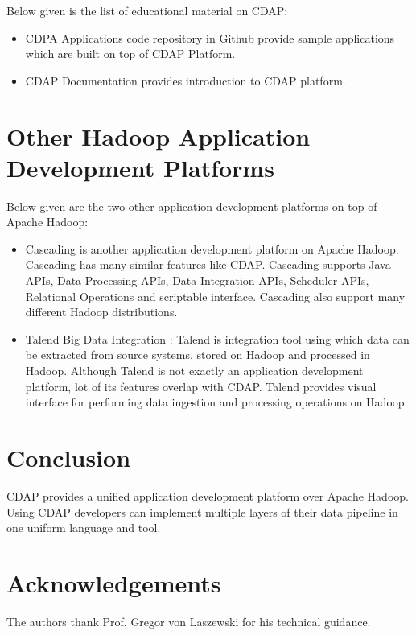 \documentclass[9pt,twocolumn,twoside]{../../styles/osajnl}
\begin{document}
Below given is the list of educational material on CDAP:
\begin{itemize}
\item CDPA Applications code repository in Github \cite{github-cdap-apps}
provide sample applications which are built on top of CDAP Platform.
\item CDAP Documentation \cite{www-cdap-getting-started} provides introduction
 to CDAP platform.
\end{itemize}

\section{Other Hadoop Application Development Platforms}
Below given are the two other application development platforms on top of
Apache Hadoop:
\begin{itemize}
\item Cascading \cite{www-cascading} is another application development
platform on Apache Hadoop. Cascading has many similar features like CDAP.
Cascading supports Java APIs, Data Processing APIs, Data Integration APIs,
Scheduler APIs, Relational Operations and scriptable interface. Cascading
also support many different Hadoop distributions.

\item Talend Big Data Integration \cite{www-talend} : Talend is integration
tool using which data can be extracted from source systems, stored on Hadoop
and processed in Hadoop. Although Talend is not exactly an application
development platform, lot of its features overlap with CDAP. Talend provides
visual interface for performing data ingestion and processing operations on
Hadoop
\end{itemize}

\section{Conclusion}
CDAP provides a unified application development platform over Apache Hadoop.
Using CDAP developers can implement multiple layers of their data pipeline in
 one uniform language and tool.

\section*{Acknowledgements}

The authors thank Prof. Gregor von Laszewski for his technical guidance.




\end{document}
